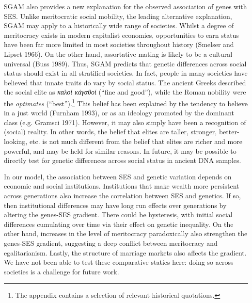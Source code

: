\documentclass[
]{article}
\theoremstyle{definition}
\theoremstyle{definition}
\theoremstyle{definition}
\theoremstyle{definition}
\theoremstyle{remark}
\begin{document}
SGAM also provides a new explanation for the observed association of genes with
SES. Unlike meritocratic social mobility, the leading alternative explanation,
SGAM may apply to a historically wide range of societies. Whilst a
degree of meritocracy exists in modern capitalist economies, opportunities to
earn status have been far more limited in most societies throughout history
(Smelser and Lipset 1966). On the other hand, assortative mating is likely to be a
cultural universal (Buss 1989). Thus, SGAM predicts that genetic differences
across social status should exist in all stratified societies. In fact, people
in many societies have believed that innate traits do vary by social
status. The ancient Greeks described the social elite as \emph{καλοί κἀγαθοί} (``fine
and good''), while the Roman nobility were the \emph{optimates} (``best'').\footnote{The appendix contains a selection of relevant historical
  quotations.} This
belief has been explained by the tendency to believe in a just world
(Furnham 1993), or as an ideology promoted by the dominant class (e.g. Gramsci 1971). However, it may also simply have been a recognition of
(social) reality. In other words, the belief that elites are taller, stronger,
better-looking, etc. is not much different from the belief that elites are
richer and more powerful, and may be held for similar reasons. In future, it
may be possible to directly test for genetic differences across social status
in ancient DNA samples.

In our model, the association between SES and genetic variation depends on
economic and social institutions. Institutions that make wealth more persistent
across generations also increase the correlation between SES and genetics. If
so, then institutional differences may have long run effects over generations by
altering the genes-SES gradient. There could be hysteresis, with initial social
differences cumulating over time via their effect on genetic inequality. On the
other hand, increases in the level of meritocracy paradoxically also strengthen
the genes-SES gradient, suggesting a deep conflict between meritocracy and
egalitarianism. Lastly, the structure of marriage markets also affects the
gradient. We have not been able to test these comparative statics here: doing
so across societies is a challenge for future work.
\end{document}
